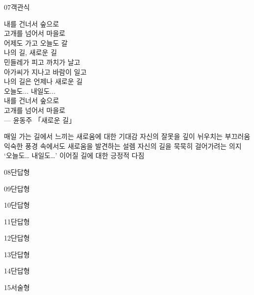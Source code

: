 \documentclass[fs9,seriesRus]{korfarm-base}
\begin{document}
\begin{kfQBlock}{07}{객관식}
\begin{kfEvidence}내를 건너서 숲으로 \\\relax
고개를 넘어서 마을로 \\\relax
어제도 가고 오늘도 갈 \\\relax
나의 길, 새로운 길 \\\relax
민들레가 피고 까치가 날고 \\\relax
아가씨가 지나고 바람이 일고 \\\relax
나의 길은 언제나 새로운 길 \\\relax
오늘도... 내일도... \\\relax
내를 건너서 숲으로 \\\relax
고개를 넘어서 마을로 \\\relax
— 윤동주 「새로운 길」\end{kfEvidence}
\begin{kfChoices}
\kfChoice 매일 가는 길에서 느끼는 새로움에 대한 기대감
\kfChoice 자신의 잘못을 깊이 뉘우치는 부끄러움
\kfChoice 익숙한 풍경 속에서도 새로움을 발견하는 설렘
\kfChoice 자신의 길을 묵묵히 걸어가려는 의지
\kfChoice ‘오늘도… 내일도…’ 이어질 길에 대한 긍정적 다짐
\end{kfChoices}
\end{kfQBlock}
\begin{kfQBlock}{08}{단답형}
\end{kfQBlock}
\begin{kfQBlock}{09}{단답형}
\end{kfQBlock}
\begin{kfQBlock}{10}{단답형}
\end{kfQBlock}
\begin{kfQBlock}{11}{단답형}
\end{kfQBlock}
\begin{kfQBlock}{12}{단답형}
\end{kfQBlock}
\begin{kfQBlock}{13}{단답형}
\end{kfQBlock}
\begin{kfQBlock}{14}{단답형}
\end{kfQBlock}
\begin{kfQBlock}{15}{서술형}
\end{kfQBlock}
\kfEndMC
\end{document}
